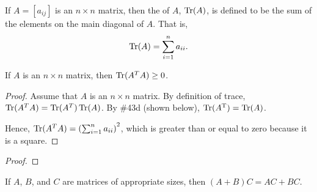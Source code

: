 \documentclass{article}
\begin{document}


\begin{defn*} If $A = [a_{ij}]$ is an $n \times n$ matrix, then the  of $A$, $\operatorname{Tr}(A)$, is defined to be the sum of the elements on the main diagonal of $A$.  That is, 
\[
\operatorname{Tr}(A) = \sum_{i = 1}^n a_{ii}.
\]
\end{defn*}

\begin{prop*} 
    If $A$ is an $n \times n$ matrix, then $\operatorname{Tr}(A^{T} A) \geq 0$.
\end{prop*}


\begin{proof} 
    Assume that $A$ is an $n \times n$ matrix. By definition of trace, $\operatorname{Tr}(A^{T}A) = \operatorname{Tr}(A^{T})\operatorname{Tr}(A)$.  By \#43d (shown below), $\operatorname{Tr}(A^{\text{T}}) =\operatorname{Tr}(A)$.

    Hence, $\operatorname{Tr}(A^{T}A) = \left( \sum_{i=1}^n a_{ii} \right)^2$, which is greater than or equal to zero because it is a square.\end{proof}

\begin{prop*} 
\end{prop*}

\begin{proof}
\end{proof}


\begin{prop*}[\S1.4, \#4(b)] 
    If $A$, $B$, and $C$ are matrices of appropriate sizes, then $(A+B)C = AC + BC$.
\end{prop*}

\end{document}
